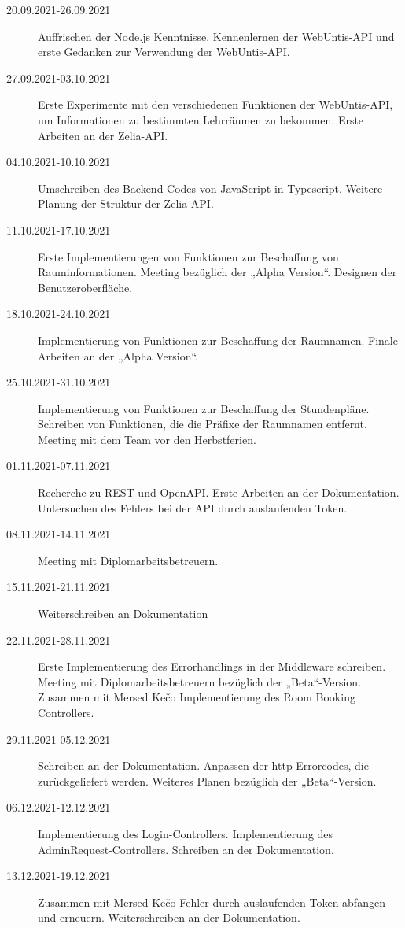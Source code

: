 
\begin{description}
    \item[20.09.2021-26.09.2021] Auffrischen der Node.js Kenntnisse. Kennenlernen der WebUntis-API und erste Gedanken zur Verwendung der WebUntis-API.
    \item[27.09.2021-03.10.2021] Erste Experimente mit den verschiedenen Funktionen der WebUntis-API, um Informationen zu bestimmten Lehrräumen zu bekommen. Erste Arbeiten an der Zelia-API. 
    \item[04.10.2021-10.10.2021] Umschreiben des Backend-Codes von JavaScript in Typescript. Weitere Planung der Struktur der Zelia-API.
    \item[11.10.2021-17.10.2021] Erste Implementierungen von Funktionen zur Beschaffung von Rauminformationen. Meeting bezüglich der „Alpha Version“. Designen der Benutzeroberfläche. 
    \item[18.10.2021-24.10.2021] Implementierung von Funktionen zur Beschaffung der Raumnamen. Finale Arbeiten an der „Alpha Version“.
    \item[25.10.2021-31.10.2021] Implementierung von Funktionen zur Beschaffung der Stundenpläne. Schreiben von Funktionen, die die Präfixe der Raumnamen entfernt. Meeting mit dem Team vor den Herbstferien. 
    \item[01.11.2021-07.11.2021] Recherche zu REST und OpenAPI. Erste Arbeiten an der Dokumentation. Untersuchen des Fehlers bei der API durch auslaufenden Token. 
    \item[08.11.2021-14.11.2021] Meeting mit Diplomarbeitsbetreuern.
    \item[15.11.2021-21.11.2021] Weiterschreiben an Dokumentation
    \item[22.11.2021-28.11.2021] Erste Implementierung des Errorhandlings in der Middleware schreiben. Meeting mit Diplomarbeitsbetreuern bezüglich der „Beta“-Version. Zusammen mit Mersed Kečo Implementierung des Room Booking Controllers.
    \item[29.11.2021-05.12.2021] Schreiben an der Dokumentation. Anpassen der http-Errorcodes, die zurückgeliefert werden. Weiteres Planen bezüglich der „Beta“-Version.
    \item[06.12.2021-12.12.2021] Implementierung des Login-Controllers. Implementierung des AdminRequest-Controllers. Schreiben an der Dokumentation. 
    \item[13.12.2021-19.12.2021] Zusammen mit Mersed Kečo Fehler durch auslaufenden Token abfangen und erneuern. Weiterschreiben an der Dokumentation. 

\end{description}
